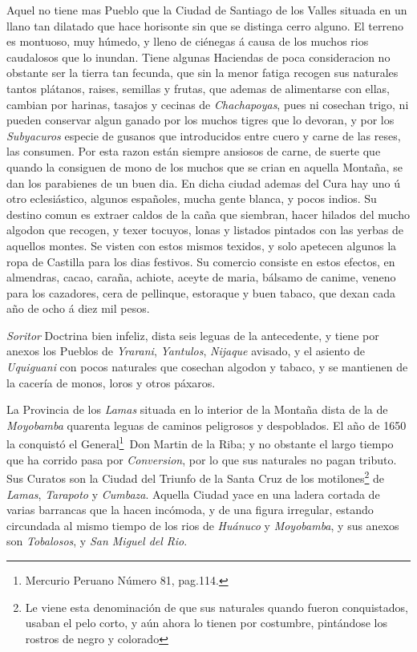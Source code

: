 \documentclass[12pt,a4paper]{article}
\begin{document}
Aquel no tiene mas Pueblo que la Ciudad de Santiago de los Valles situada en un llano tan dilatado que hace horisonte sin que se distinga cerro alguno. El terreno es montuoso, muy húmedo, y lleno de ciénegas á causa de los muchos rios caudalosos que lo inundan. Tiene algunas Haciendas de poca consideracion no obstante ser la tierra tan fecunda, que sin la menor fatiga recogen sus naturales tantos plátanos, raises, semillas y frutas, que ademas de alimentarse con ellas, cambian por harinas, tasajos y cecinas de \emph{Chachapoyas}, pues ni cosechan trigo, ni pueden conservar algun ganado por los muchos tigres que lo devoran, y por los \emph{Subyacuros} especie de gusanos que introducidos entre cuero y carne de las reses, las consumen. Por esta razon están siempre ansiosos de carne, de suerte que quando la consiguen de mono de los muchos que se crian en aquella Montaña, se dan los parabienes de un buen dia. En dicha ciudad ademas del Cura hay uno ú otro eclesiástico, algunos españoles, mucha gente blanca, y pocos indios. Su destino comun es extraer caldos de la caña que siembran, hacer hilados del mucho algodon que recogen, y texer tocuyos, lonas y listados pintados con las yerbas de aquellos montes. Se visten con estos mismos texidos, y solo apetecen algunos la ropa de Castilla para los dias festivos. Su comercio consiste en estos efectos, en almendras, cacao, caraña, achiote, aceyte de maria, bálsamo de canime, veneno para los cazadores, cera de pellinque, estoraque y buen tabaco, que dexan cada año de ocho á diez mil pesos.

\emph{Soritor} Doctrina bien infeliz, dista seis leguas de la antecedente, y tiene por anexos los Pueblos de \emph{Yrarani}, \emph{Yantulos}, \emph{Nijaque} avisado, y el asiento de \emph{Uquiguani} con pocos naturales que cosechan algodon y tabaco, y se mantienen de la cacería de monos, loros y otros páxaros.

La Provincia de los \emph{Lamas} situada en lo interior de la Montaña dista de la de \emph{Moyobamba} quarenta leguas de caminos peligrosos y despoblados. El año de 1650 la conquistó el General\footnote{Mercurio Peruano Número 81, pag.114.}\ Don Martin de la Riba; y no obstante el largo tiempo que ha corrido pasa por \emph{Conversion}, por lo que sus naturales no pagan tributo. Sus Curatos son la Ciudad del Triunfo de la Santa Cruz de los motilones\footnote{Le viene esta denominación de que sus naturales quando fueron conquistados, usaban el pelo corto, y aún ahora lo tienen por costumbre, pintándose los rostros de negro y colorado} de \emph{Lamas}, \emph{Tarapoto} y \emph{Cumbaza}. Aquella Ciudad yace en una ladera cortada de varias barrancas que la hacen incómoda, y de una figura irregular, estando circundada al mismo tiempo de los rios de \emph{Huánuco} y \emph{Moyobamba}, y sus anexos son \emph{Tobalosos}, y \emph{San Miguel del Rio}.
\end{document}
